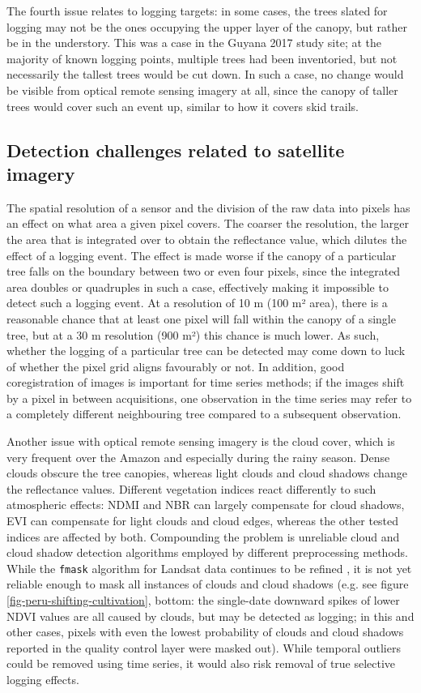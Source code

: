 \documentclass[a4paper,12pt]{scrbook}
\begin{document}
The fourth issue relates to logging targets: in some cases, the trees slated for logging may not be the ones occupying the upper layer of the canopy, but rather be in the understory. This was a case in the Guyana 2017 study site; at the majority of known logging points, multiple trees had been inventoried, but not necessarily the tallest trees would be cut down. In such a case, no change would be visible from optical remote sensing imagery at all, since the canopy of taller trees would cover such an event up, similar to how it covers skid trails.

\subsection{Detection challenges related to satellite imagery}

The spatial resolution of a sensor and the division of the raw data into pixels has an effect on what area a given pixel covers. The coarser the resolution, the larger the area that is integrated over to obtain the reflectance value, which dilutes the effect of a logging event. The effect is made worse if the canopy of a particular tree falls on the boundary between two or even four pixels, since the integrated area doubles or quadruples in such a case, effectively making it impossible to detect such a logging event. At a resolution of 10 m (100 m² area), there is a reasonable chance that at least one pixel will fall within the canopy of a single tree, but at a 30 m resolution (900 m²) this chance is much lower. As such, whether the logging of a particular tree can be detected may come down to luck of whether the pixel grid aligns favourably or not. In addition, good coregistration of images is important for time series methods; if the images shift by a pixel in between acquisitions, one observation in the time series may refer to a completely different neighbouring tree compared to a subsequent observation.

Another issue with optical remote sensing imagery is the cloud cover, which is very frequent over the Amazon and especially during the rainy season. Dense clouds obscure the tree canopies, whereas light clouds and cloud shadows change the reflectance values. Different vegetation indices react differently to such atmospheric effects: \ac{NDMI} and \ac{NBR} can largely compensate for cloud shadows, \ac{EVI} can compensate for light clouds and cloud edges, whereas the other tested indices are affected by both. Compounding the problem is unreliable cloud and cloud shadow detection algorithms employed by different preprocessing methods. While the \texttt{fmask} algorithm for Landsat data continues to be refined \citep{zhu_improvement_2015, qiu_improving_2017}, it is not yet reliable enough to mask all instances of clouds and cloud shadows (e.g. see figure \ref{fig-peru-shifting-cultivation}, bottom: the single-date downward spikes of lower \ac{NDVI} values are all caused by clouds, but may be detected as logging; in this and other cases, pixels with even the lowest probability of clouds and cloud shadows reported in the quality control layer were masked out). While temporal outliers could be removed using time series, it would also risk removal of true selective logging effects.
\end{document}
